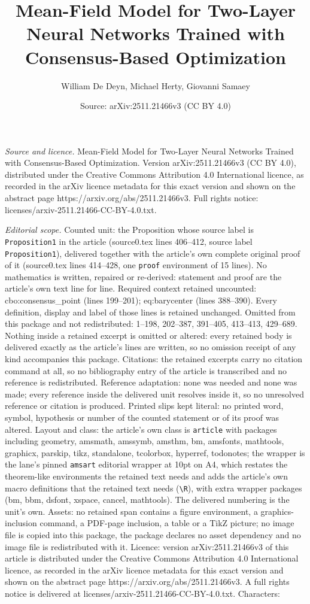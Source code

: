 \documentclass[10pt,a4paper]{amsart}
\title[Mean-Field Model for Two-Layer Neural Networks Trained with ]{Mean-Field Model for Two-Layer Neural Networks Trained with Consensus-Based Optimization}
\author{William De Deyn, Michael Herty, Giovanni Samaey}
\date{Source: arXiv:2511.21466v3 (CC BY 4.0)}
\begin{document}
\maketitle

\noindent\emph{Source and licence.} Mean-Field Model for Two-Layer Neural Networks Trained with Consensus-Based Optimization. Version arXiv:2511.21466v3 (CC BY 4.0), distributed under the Creative Commons Attribution 4.0 International licence, as recorded in the arXiv licence metadata for this exact version and shown on the abstract page https://arxiv.org/abs/2511.21466v3. Full rights notice: licenses/arxiv-2511.21466-CC-BY-4.0.txt.\par\smallskip

\noindent\textit{Editorial scope.} Counted unit: the Proposition whose source label is \texttt{Proposition1} in the article (source0.tex lines 406--412, source label \texttt{Proposition1}), delivered together with the article's own complete original proof of it (source0.tex lines 414--428, one \texttt{proof} environment of 15 lines). No mathematics is written, repaired or re-derived: statement and proof are the article's own text line for line. Required context retained uncounted: cbo:consensus\_point (lines 199--201); eq:barycenter (lines 388--390). Every definition, display and label of those lines is retained unchanged. Omitted from this package and not redistributed: 1--198, 202--387, 391--405, 413--413, 429--689. Nothing inside a retained excerpt is omitted or altered: every retained body is delivered exactly as the article's lines are written, so no omission receipt of any kind accompanies this package. Citations: the retained excerpts carry no citation command at all, so no bibliography entry of the article is transcribed and no reference is redistributed. Reference adaptation: none was needed and none was made; every reference inside the delivered unit resolves inside it, so no unresolved reference or citation is produced. Printed slips kept literal: no printed word, symbol, hypothesis or number of the counted statement or of its proof was altered. Layout and class: the article's own class is \texttt{article} with packages including geometry, amsmath, amssymb, amsthm, bm, amsfonts, mathtools, graphicx, parskip, tikz, standalone, tcolorbox, hyperref, todonotes; the wrapper is the lane's pinned \texttt{amsart} editorial wrapper at 10pt on A4, which restates the theorem-like environments the retained text needs and adds the article's own macro definitions that the retained text needs (\texttt{\textbackslash R}), with extra wrapper packages (bm, bbm, dsfont, xspace, cancel, mathtools). The delivered numbering is the unit's own. Assets: no retained span contains a figure environment, a graphics-inclusion command, a PDF-page inclusion, a table or a TikZ picture; no image file is copied into this package, the package declares no asset dependency and no image file is redistributed with it. Licence: version arXiv:2511.21466v3 of this article is distributed under the Creative Commons Attribution 4.0 International licence, as recorded in the arXiv licence metadata for this exact version and shown on the abstract page https://arxiv.org/abs/2511.21466v3. A full rights notice is delivered at licenses/arxiv-2511.21466-CC-BY-4.0.txt. Characters: 
\end{document}
